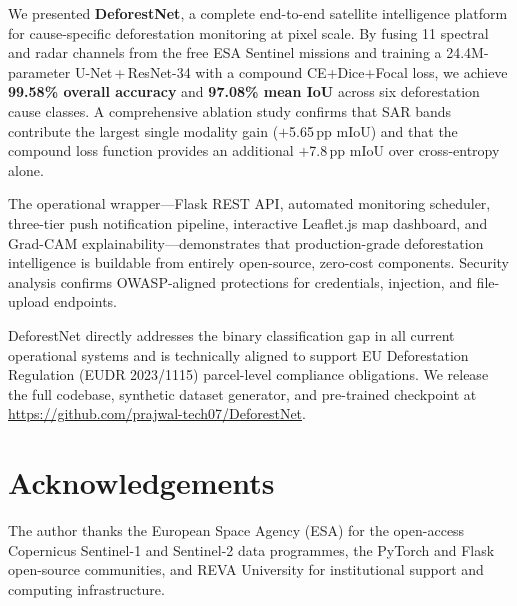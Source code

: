 \documentclass[10pt,conference]{IEEEtran}
\begin{document}
We presented \textbf{DeforestNet}, a complete end-to-end satellite intelligence
platform for cause-specific deforestation monitoring at pixel scale. By fusing
11 spectral and radar channels from the free ESA Sentinel missions and training
a 24.4M-parameter U-Net\,+\,ResNet-34 with a compound CE+Dice+Focal loss,
we achieve \textbf{99.58\% overall accuracy} and \textbf{97.08\% mean IoU}
across six deforestation cause classes. A comprehensive ablation study confirms
that SAR bands contribute the largest single modality gain ($+$5.65\,pp mIoU)
and that the compound loss function provides an additional $+$7.8\,pp mIoU over
cross-entropy alone.

The operational wrapper---Flask REST API, automated monitoring scheduler,
three-tier push notification pipeline, interactive Leaflet.js map dashboard, and
Grad-CAM explainability---demonstrates that production-grade deforestation
intelligence is buildable from entirely open-source, zero-cost components.
Security analysis confirms OWASP-aligned protections for credentials, injection,
and file-upload endpoints.

DeforestNet directly addresses the binary classification gap in all current
operational systems and is technically aligned to support EU Deforestation
Regulation (EUDR 2023/1115) parcel-level compliance obligations. We release the
full codebase, synthetic dataset generator, and pre-trained checkpoint at
\url{https://github.com/prajwal-tech07/DeforestNet}.

\section*{Acknowledgements}

The author thanks the European Space Agency (ESA) for the open-access Copernicus
Sentinel-1 and Sentinel-2 data programmes, the PyTorch and Flask open-source
communities, and REVA University for institutional support and computing
infrastructure.
\end{document}
